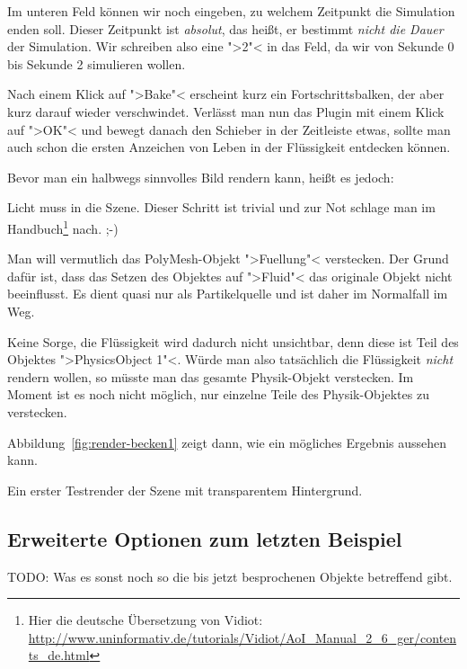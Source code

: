 \documentclass[10pt,DIV=14,a4paper]{scrartcl}
\begin{document}
\itE

Im unteren Feld können wir noch eingeben, zu welchem Zeitpunkt die
Simulation enden soll. Dieser Zeitpunkt ist \emph{absolut}, das heißt,
er bestimmt \emph{nicht die Dauer} der Simulation. Wir schreiben also
eine ">2"< in das Feld, da wir von Sekunde 0 bis Sekunde 2 simulieren
wollen.

Nach einem Klick auf ">Bake"< erscheint kurz ein Fortschrittsbalken, der
aber kurz darauf wieder verschwindet. Verlässt man nun das Plugin mit
einem Klick auf ">OK"< und bewegt danach den Schieber in der Zeitleiste
etwas, sollte man auch schon die ersten Anzeichen von Leben in der
Flüssigkeit entdecken können.

Bevor man ein halbwegs sinnvolles Bild rendern kann, heißt es jedoch:

\itA
	\item Licht muss in die Szene. Dieser Schritt ist trivial und zur
	Not schlage man im Handbuch\footnote{Hier die deutsche Übersetzung
	von Vidiot: \\
	\url{http://www.uninformativ.de/tutorials/Vidiot/AoI_Manual_2_6_ger/contents_de.html}}
	nach. ;-)

	\item Man will vermutlich das PolyMesh-Objekt ">Fuellung"<
	verstecken. Der Grund dafür ist, dass das Setzen des Objektes auf
	">Fluid"< das originale Objekt nicht beeinflusst. Es dient quasi nur
	als Partikelquelle und ist daher im Normalfall im Weg.

	Keine Sorge, die Flüssigkeit wird dadurch nicht unsichtbar, denn
	diese ist Teil des Objektes ">PhysicsObject 1"<. Würde man also
	tatsächlich die Flüssigkeit \emph{nicht} rendern wollen, so müsste
	man das gesamte Physik-Objekt verstecken. Im Moment ist es noch
	nicht möglich, nur einzelne Teile des Physik-Objektes zu verstecken.

\itE

Abbildung~\ref{fig:render-becken1} zeigt dann, wie ein mögliches
Ergebnis aussehen kann.

{Ein erster Testrender der Szene mit transparentem Hintergrund.}

\subsection{Erweiterte Optionen zum letzten Beispiel}
TODO: Was es sonst noch so die bis jetzt besprochenen Objekte betreffend gibt.
\end{document}
